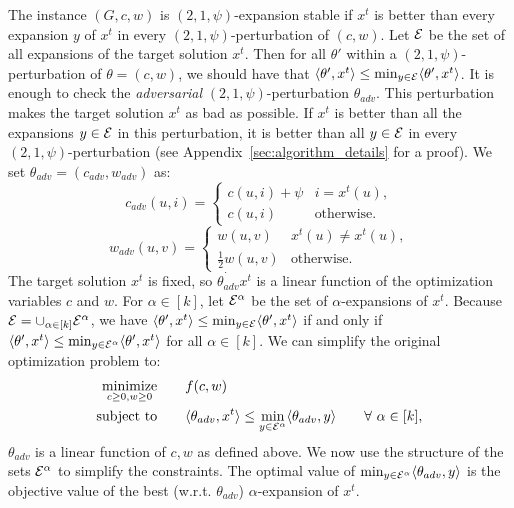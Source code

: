 The instance $(G,c,w)$ is $(2,1,\psi)$-expansion stable if $x^t$ is better than every expansion $y$ of $x^t$ in every $(2,1,\psi)$-perturbation of $(c,w)$. 
Let $\mathcal{E}$ be the set of all expansions of the target solution $x^t$.
Then for all $\theta'$ within a $(2,1,\psi)$-perturbation of $\theta=(c,w)$, we should have that $\langle \theta',x^t\rangle \le \min_{y\in \mathcal{E}}\langle \theta',x^t\rangle$.
It is enough to check the \emph{adversarial} $(2,1,\psi)$-perturbation $\theta_{adv}$. 
This perturbation makes the target solution $x^t$ as bad as possible. 
If $x^t$ is better than all the expansions $y\in \mathcal{E}$ in this perturbation, it is better than all $y\in \mathcal{E}$ in every $(2,1,\psi)$-perturbation (see Appendix~\ref{sec:algorithm_details} for a proof).
We set $\theta_{adv} = (c_{adv}, w_{adv})$ as:
\begin{equation*}
    c_{adv}(u,i) = \begin{cases}
    c(u,i) + \psi & i = x^t(u),\\
    c(u,i) & \text{otherwise}.
    \end{cases}
\end{equation*}
\begin{equation*}
    w_{adv}(u,v) = \begin{cases}
    w(u,v) & x^t(u) \ne x^t(u),\\
    \frac{1}{2}w(u,v) & \text{otherwise}.
    \end{cases}
\end{equation*}
The target solution $x^t$ is fixed, so $\dot{\theta_{adv}}{x^t}$ is a linear function of the optimization variables $c$ and $w$.
 For $\alpha \in [k]$, let $\mathcal{E}^{\alpha}$ be the set of $\alpha$-expansions of $x^t$. Because $\mathcal{E} = \cup_{\alpha \in [k]} \mathcal{E}^{\alpha}$, we have $\langle \theta',x^t\rangle \le \min_{y\in \mathcal{E}}\langle \theta',x^t\rangle$ if and only if $\langle \theta',x^t\rangle \le \min_{y\in \mathcal{E}^{\alpha}}\langle \theta',x^t\rangle$ for all $\alpha \in [k]$.
We can simplify the original optimization problem to:
\begin{align*}
\mathop{\mathrm{minimize}{}}_{c\ge 0,w\ge 0} \qquad & f(c,w)\\
\text{subject to} \qquad & \langle \theta_{adv},x^t\rangle \le \min_{y\in \mathcal{E}^{\alpha}}\langle \theta_{adv},y\rangle \qquad \forall\ \alpha \in [k],
\end{align*}
$\theta_{adv}$ is a linear function of $c,w$ as defined above. 
We now use the structure of the sets $\mathcal{E}^{\alpha}$ to simplify the constraints. 
The optimal value of $\min_{y\in \mathcal{E}^{\alpha}}\langle \theta_{adv},y\rangle$ is the objective value of the best (w.r.t. $\theta_{adv}$) $\alpha$-expansion of $x^t$.
